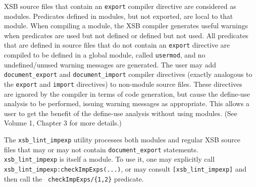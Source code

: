 XSB source files that contain an {\tt export} compiler directive are
considered as modules.  Predicates defined in modules, but not
exported, are local to that module.  When compiling a module, the XSB
compiler generates useful warnings when predicates are used but not
defined or defined but not used.  All predicates that are defined in
source files that do not contain an {\tt export} directive are
compiled to be defined in a global module, called {\tt usermod}, and
no undefined/unused warning messages are generated.  The user may add
{\tt document\_export} and {\tt document\_import} compiler directives
(exactly analogous to the {\tt export} and {\tt import} directives) to
non-module source files.  These directives are ignored by the compiler
in terms of code generation, but cause the define-use analysis to be
performed, issuing warning messages as appropriate.  This allows a
user to get the benefit of the define-use analysis without using
modules.  (See Volume 1, Chapter 3 for more details.)

The {\tt xsb\_lint\_impexp} utility processes both modules and regular
XSB source files that may or may not contain {\tt document\_export}
statements.
%
{\tt xsb\_lint\_impexp} is itself a module.  To use it, one may
explicitly call {\tt xsb\_lint\_impexp:checkImpExps(...)}, or may
consult {\tt [xsb\_lint\_impexp]} and then call the {\tt
  checkImpExps/\{1,2\}} predicate.

